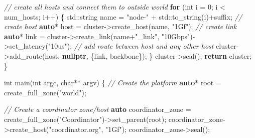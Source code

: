 \documentclass[
]{article}
\newenvironment{Shaded}{}{}
\newcommand{\BuiltInTok}[1]{\textcolor[rgb]{0.00,0.50,0.00}{#1}}
\newcommand{\CommentTok}[1]{\textcolor[rgb]{0.38,0.63,0.69}{\textit{#1}}}
\newcommand{\ControlFlowTok}[1]{\textcolor[rgb]{0.00,0.44,0.13}{\textbf{#1}}}
\newcommand{\DataTypeTok}[1]{\textcolor[rgb]{0.56,0.13,0.00}{#1}}
\newcommand{\DecValTok}[1]{\textcolor[rgb]{0.25,0.63,0.44}{#1}}
\newcommand{\KeywordTok}[1]{\textcolor[rgb]{0.00,0.44,0.13}{\textbf{#1}}}
\newcommand{\NormalTok}[1]{#1}
\newcommand{\OperatorTok}[1]{\textcolor[rgb]{0.40,0.40,0.40}{#1}}
\newcommand{\StringTok}[1]{\textcolor[rgb]{0.25,0.44,0.63}{#1}}
\begin{document}
\begin{Shaded}
\begin{Highlighting}[]
    \CommentTok{// create all hosts and connect them to outside world}
    \ControlFlowTok{for} \OperatorTok{(}\DataTypeTok{int}\NormalTok{ i }\OperatorTok{=} \DecValTok{0}\OperatorTok{;}\NormalTok{ i }\OperatorTok{\textless{}}\NormalTok{ num\_hosts}\OperatorTok{;}\NormalTok{ i}\OperatorTok{++)} \OperatorTok{\{}
    \BuiltInTok{std::}\NormalTok{string name }\OperatorTok{=} \StringTok{"node{-}"} \OperatorTok{+} \BuiltInTok{std::}\NormalTok{to\_string}\OperatorTok{(}\NormalTok{i}\OperatorTok{)+}\NormalTok{suffix}\OperatorTok{;}
    \CommentTok{// create host}
    \KeywordTok{auto}\OperatorTok{*}\NormalTok{ host }\OperatorTok{=}\NormalTok{ cluster}\OperatorTok{{-}\textgreater{}}\NormalTok{create\_host}\OperatorTok{(}\NormalTok{name}\OperatorTok{,} \StringTok{"1Gf"}\OperatorTok{);}
    \CommentTok{// create link}
    \KeywordTok{auto}\OperatorTok{*}\NormalTok{ link }\OperatorTok{=}\NormalTok{ cluster}\OperatorTok{{-}\textgreater{}}\NormalTok{create\_link}\OperatorTok{(}\NormalTok{name}\OperatorTok{+}\StringTok{"\_link"}\OperatorTok{,} \StringTok{"10Gbps"}\OperatorTok{){-}\textgreater{}}\NormalTok{set\_latency}\OperatorTok{(}\StringTok{"10us"}\OperatorTok{);}
    \CommentTok{// add route between host and any other host}
\NormalTok{    cluster}\OperatorTok{{-}\textgreater{}}\NormalTok{add\_route}\OperatorTok{(}\NormalTok{host}\OperatorTok{,} \KeywordTok{nullptr}\OperatorTok{,} \OperatorTok{\{}\NormalTok{link}\OperatorTok{,}\NormalTok{ backbone}\OperatorTok{\});}
    \OperatorTok{\}}
\NormalTok{    cluster}\OperatorTok{{-}\textgreater{}}\NormalTok{seal}\OperatorTok{();}
    \ControlFlowTok{return}\NormalTok{ cluster}\OperatorTok{;}
\OperatorTok{\}}

\DataTypeTok{int}\NormalTok{ main}\OperatorTok{(}\DataTypeTok{int}\NormalTok{ argc}\OperatorTok{,} \DataTypeTok{char}\OperatorTok{**}\NormalTok{ argv}\OperatorTok{)} \OperatorTok{\{}
    \CommentTok{// Create the platform}
    \KeywordTok{auto}\OperatorTok{*}\NormalTok{ root }\OperatorTok{=}\NormalTok{ create\_full\_zone}\OperatorTok{(}\StringTok{"world"}\OperatorTok{);}

    \CommentTok{// Create a coordinator zone/host}
    \KeywordTok{auto}\NormalTok{ coordinator\_zone }\OperatorTok{=}\NormalTok{ create\_full\_zone}\OperatorTok{(}\StringTok{"Coordinator"}\OperatorTok{){-}\textgreater{}}\NormalTok{set\_parent}\OperatorTok{(}\NormalTok{root}\OperatorTok{);}
\NormalTok{    coordinator\_zone}\OperatorTok{{-}\textgreater{}}\NormalTok{create\_host}\OperatorTok{(}\StringTok{"coordinator.org"}\OperatorTok{,} \StringTok{"1Gf"}\OperatorTok{);}
\NormalTok{    coordinator\_zone}\OperatorTok{{-}\textgreater{}}\NormalTok{seal}\OperatorTok{();}


\end{Highlighting}
\end{Shaded}
\end{document}
